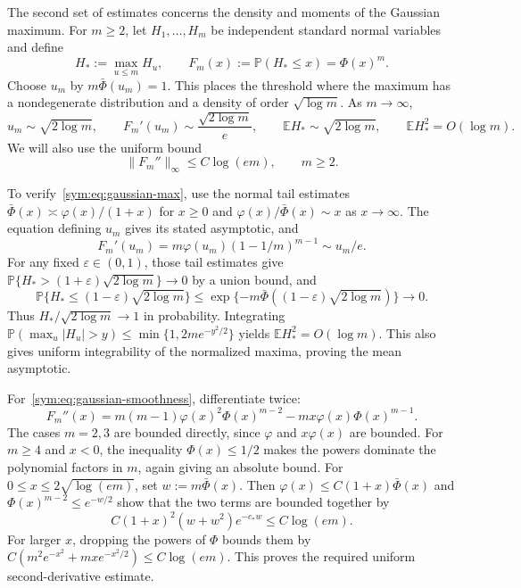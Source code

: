 \documentclass[11pt,letterpaper,twoside,leqno]{article}
\theoremstyle{bookplain}
\theoremstyle{bookremark}
\newcommand{\E}{\mathbb E}
\newcommand{\Pp}{\mathbb P}
\begin{document}
The second set of estimates concerns the density and moments of
the Gaussian maximum. For $m\ge2$, let $H_1,\ldots,H_m$ be
independent standard normal variables and define
\[
 H_*:=\max_{u\le m}H_u,\qquad F_m(x):=\Pp(H_*\le x)=\Phi(x)^m.
\]
Choose $u_m$ by $m\bar\Phi(u_m)=1$. This places the threshold
where the maximum has a nondegenerate distribution and a density
of order $\sqrt{\log m}$. As $m\to\infty$,
\begin{equation}
 u_m\sim\sqrt{2\log m},\qquad
 F_m'(u_m)\sim\frac{\sqrt{2\log m}}e,\qquad
 \E H_*\sim\sqrt{2\log m},\qquad \E H_*^2=O(\log m).
 \label{sym:eq:gaussian-max}
\end{equation}
We will also use the uniform bound
\begin{equation}
 \|F_m''\|_\infty\le C\log(em),\qquad m\ge2.
 \label{sym:eq:gaussian-smoothness}
\end{equation}

To verify~\eqref{sym:eq:gaussian-max}, use the normal tail estimates
$\bar\Phi(x)\asymp\varphi(x)/(1+x)$ for $x\ge0$ and
$\varphi(x)/\bar\Phi(x)\sim x$ as $x\to\infty$.
The equation defining $u_m$ gives its stated asymptotic, and
\[
 F_m'(u_m)=m\varphi(u_m)(1-1/m)^{m-1}
          \sim u_m/e.
\]
For any fixed $\varepsilon\in(0,1)$, those tail estimates
give $\Pp\{H_*>(1+\varepsilon)\sqrt{2\log m}\}\to0$ by a
union bound, and
\[
 \Pp\{H_*\le(1-\varepsilon)\sqrt{2\log m}\}
 \le\exp\{-m\bar\Phi((1-\varepsilon)\sqrt{2\log m})\}
 \longrightarrow0.
\]
Thus $H_*/\sqrt{2\log m}\to1$ in probability. Integrating
$\Pp(\max_u|H_u|>y)\le\min\{1,2me^{-y^2/2}\}$ yields
$\E H_*^2=O(\log m)$. This also gives uniform integrability
of the normalized maxima, proving the mean asymptotic.

For~\eqref{sym:eq:gaussian-smoothness}, differentiate twice:
\[
 F_m''(x)=m(m-1)\varphi(x)^2\Phi(x)^{m-2}
             -mx\varphi(x)\Phi(x)^{m-1}.
\]
The cases $m=2,3$ are bounded directly, since $\varphi$ and
$x\varphi(x)$ are bounded. For $m\ge4$ and $x<0$, the
inequality $\Phi(x)\le1/2$ makes the powers dominate the
polynomial factors in $m$, again giving an absolute bound.
For $0\le x\le2\sqrt{\log(em)}$, set $w:=m\bar\Phi(x)$.
Then $\varphi(x)\le C(1+x)\bar\Phi(x)$ and
$\Phi(x)^{m-2}\le e^{-w/2}$ show that the two terms are
bounded together by
\[
 C(1+x)^2(w+w^2)e^{-c_*w}\le C\log(em).
\]
For larger $x$, dropping the powers of $\Phi$ bounds them by
$C(m^2e^{-x^2}+mx e^{-x^2/2})\le C\log(em)$.
This proves the required uniform second-derivative estimate.
\end{document}
